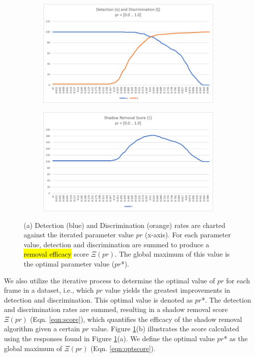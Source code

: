 \begin{figure}
  \centering
  \begin{subfigure}{.8\linewidth}
  	\includegraphics[width=1\linewidth]{figures/campus_dd.jpg}
  \caption{}
  \end{subfigure}
  \hfill
  \begin{subfigure}{.8\linewidth}
  	\includegraphics[width=1\linewidth]{figures/campus_score.jpg}
  \caption{}
  \end{subfigure}
\caption{(a) Detection (blue) and Discrimination (orange) rates are charted against the iterated parameter value $pr$ (x-axis). For each parameter value, detection and discrimination are summed to produce a \hl{removal efficacy} score $\Xi(pr)$. The global maximum of this value is the optimal parameter value ($pr$*).}
\label{fig:campusddscore}
\end{figure}

We also utilize the iterative process to determine the optimal value of $pr$ for each frame in a dataset, i.e., which $pr$ value yields the greatest improvements in detection and discrimination. This optimal value is denoted as $pr$*. The detection and discrimination rates are summed, resulting in a shadow removal score $\Xi(pr)$ (Eqn. \ref{eqn:score}), which quantifies the efficacy of the shadow removal algorithm given a certain $pr$ value. Figure \ref{fig:campusddscore}(b) illustrates the score calculated using the responses found in Figure \ref{fig:campusddscore}(a). We define the optimal value $pr$* as the global maximum of $\Xi(pr)$ (Eqn. \ref{eqn:optscore}).


